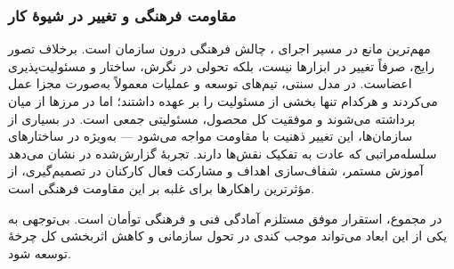 \subsubsection*{مقاومت فرهنگی و تغییر در شیوهٔ کار}

مهم‌ترین مانع در مسیر اجرای ، چالش فرهنگی درون سازمان است. برخلاف تصور رایج،  صرفاً تغییر در ابزارها نیست، بلکه تحولی در نگرش، ساختار و مسئولیت‌پذیری اعضاست. در مدل سنتی، تیم‌های توسعه و عملیات معمولاً به‌صورت مجزا عمل می‌کردند و هرکدام تنها بخشی از مسئولیت را بر عهده داشتند؛ اما در  مرزها از میان برداشته می‌شوند و موفقیت کل محصول، مسئولیتی جمعی است.
در بسیاری از سازمان‌ها، این تغییر ذهنیت با مقاومت مواجه می‌شود — به‌ویژه در ساختارهای سلسله‌مراتبی که عادت به تفکیک نقش‌ها دارند. تجربهٔ گزارش‌شده در \cite{Jha2023} نشان می‌دهد آموزش مستمر، شفاف‌سازی اهداف و مشارکت فعال کارکنان در تصمیم‌گیری، از مؤثرترین راهکارها برای غلبه بر این مقاومت فرهنگی است.

در مجموع، استقرار موفق  مستلزم آمادگی فنی و فرهنگی توأمان است. بی‌توجهی به یکی از این ابعاد می‌تواند موجب کندی در تحول سازمانی و کاهش اثربخشی کل چرخهٔ توسعه شود.
